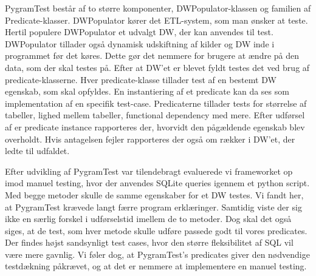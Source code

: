 PygramTest består af to større komponenter, DWPopulator-klassen og familien af Predicate-klasser. DWPopulator kører det ETL-system, som man ønsker at teste. Hertil populere DWPopulator  et udvalgt DW, der kan anvendes til test. DWPopulator tillader også dynamisk udskiftning af kilder og DW inde i programmet før det køres. Dette gør det nemmere for brugere at ændre på den data, som der skal testes på. Efter at DW’et er blevet fyldt testes det ved brug af predicate-klasserne. Hver predicate-klasse tillader test af en bestemt DW egenskab, som skal opfyldes. En instantiering af et predicate kan da ses som implementation af en specifik test-case. Predicaterne tillader tests for størrelse af tabeller, lighed mellem tabeller, functional dependency med mere. Efter udførsel af er predicate instance rapporteres der, hvorvidt den pågældende egenskab blev overholdt. Hvis antagelsen fejler rapporteres der også om rækker i DW’et, der ledte til udfaldet. 

Efter udvikling af PygramTest var tilendebragt evaluerede vi frameworket op imod manuel testing, hvor der anvendes SQLite queries igennem et python script. Med begge metoder skulle de samme egenskaber for et DW testes. Vi fandt her, at PygramTest krævede langt færre program erklæringer. Samtidig viste der sig ikke en særlig forskel i udførselstid imellem de to metoder. Dog skal det også siges, at de test, som hver metode skulle udføre passede godt til vores predicates. Der findes højst sandsynligt test cases, hvor den større fleksibilitet af SQL vil være mere gavnlig. Vi føler dog, at PygramTest’s predicates giver den nødvendige testdækning påkrævet, og at det er nemmere at implementere en manuel testing.









